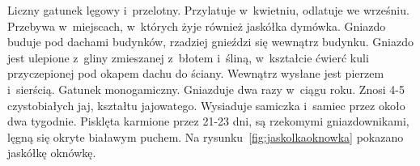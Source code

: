 \documentclass[a4paper,10pt]{report}
\begin{document}
Liczny gatunek lęgowy i~przelotny. Przylatuje w~kwietniu, odlatuje we wrześniu. Przebywa w~miejscach, w~których żyje również jaskółka dymówka. Gniazdo buduje pod dachami budynków, rzadziej gnieździ się wewnątrz budynku. Gniazdo jest ulepione z~gliny zmieszanej z~błotem i~śliną, w~kształcie ćwierć kuli przyczepionej pod okapem dachu do ściany. Wewnątrz wysłane jest pierzem i~sierścią. Gatunek monogamiczny. Gniazduje dwa razy w~ciągu roku. Znosi 4-5 czystobiałych jaj, kształtu jajowatego. Wysiaduje samiczka i~samiec przez około dwa tygodnie. Pisklęta karmione przez 21-23 dni, są rzekomymi gniazdownikami, lęgną się okryte białawym puchem. Na rysunku~\ref{fig:jaskolkaoknowka} pokazano jaskółkę oknówkę.
\end{document}
